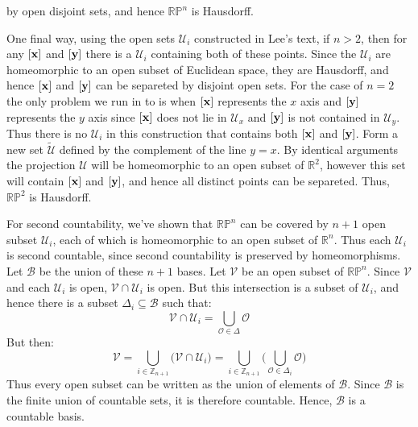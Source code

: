 \documentclass{article}                                                        %
\begin{document}
\begin{solution}
            by open disjoint sets, and hence $\mathbb{RP}^{n}$ is Hausdorff.
            \par\hfill\par
            One final way, using the open sets $\mathcal{U}_{i}$ constructed in
            Lee's text, if $n>2$, then for any $[\boldsymbol{\mathrm{x}}]$ and $[\boldsymbol{\mathrm{y}}]$
            there is a $\mathcal{U}_{i}$ containing both of these points. Since the
            $\mathcal{U}_{i}$ are homeomorphic to an open subset of Euclidean space,
            they are Hausdorff, and hence $[\boldsymbol{\mathrm{x}}]$ and $[\boldsymbol{\mathrm{y}}]$ can be
            separeted by disjoint open sets. For the case of $n=2$ the only problem
            we run in to is when $[\boldsymbol{\mathrm{x}}]$ represents the $x$ axis and
            $[\boldsymbol{\mathrm{y}}]$ represents the $y$ axis since $[\boldsymbol{\mathrm{x}}]$ does not lie
            in $\mathcal{U}_{x}$ and $[\boldsymbol{\mathrm{y}}]$ is not contained in
            $\mathcal{U}_{y}$. Thus there is no $\mathcal{U}_{i}$ in this
            construction that contains both $[\boldsymbol{\mathrm{x}}]$ and $[\boldsymbol{\mathrm{y}}]$. Form
            a new set $\tilde{\mathcal{U}}$ defined by the complement of the line
            $y=x$. By identical arguments the projection $\mathcal{U}$ will be
            homeomorphic to an open subset of $\mathbb{R}^{2}$, however this set
            will contain $[\boldsymbol{\mathrm{x}}]$ and $[\boldsymbol{\mathrm{y}}]$, and hence all distinct
            points can be separeted. Thus, $\mathbb{RP}^{2}$ is Hausdorff.
            \par\hfill\par
            For second countability, we've shown that $\mathbb{RP}^{n}$ can be
            covered by $n+1$ open subset $\mathcal{U}_{i}$, each of which is
            homeomorphic to an open subset of $\mathbb{R}^{n}$. Thus each
            $\mathcal{U}_{i}$ is second countable, since second countability is
            preserved by homeomorphisms. Let $\mathcal{B}$ be the union of these
            $n+1$ bases. Let $\mathcal{V}$ be an open subset of $\mathbb{RP}^{n}$.
            Since $\mathcal{V}$ and each $\mathcal{U}_{i}$ is open,
            $\mathcal{V}\cap\mathcal{U}_{i}$ is open. But this intersection is a
            subset of $\mathcal{U}_{i}$, and hence there is a subset
            $\Delta_{i}\subseteq\mathcal{B}$ such that:
            \begin{equation}
                \mathcal{V}\cap\mathcal{U}_{i}=
                    \bigcup_{\mathcal{O}\in\Delta}\mathcal{O}
            \end{equation}
            But then:
            \begin{equation}
                \mathcal{V}=
                \bigcup_{i\in\mathbb{Z}_{n+1}}\big(
                    \mathcal{V}\cap\mathcal{U}_{i}
                \big)
                =\bigcup_{i\in\mathbb{Z}_{n+1}}\Big(
                    \bigcup_{\mathcal{O}\in\Delta_{i}}\mathcal{O}\Big)
            \end{equation}
            Thus every open subset can be written as the union of elements of
            $\mathcal{B}$. Since $\mathcal{B}$ is the finite union of countable
            sets, it is therefore countable. Hence, $\mathcal{B}$ is a countable
            basis.
        \end{solution}
\end{document}
